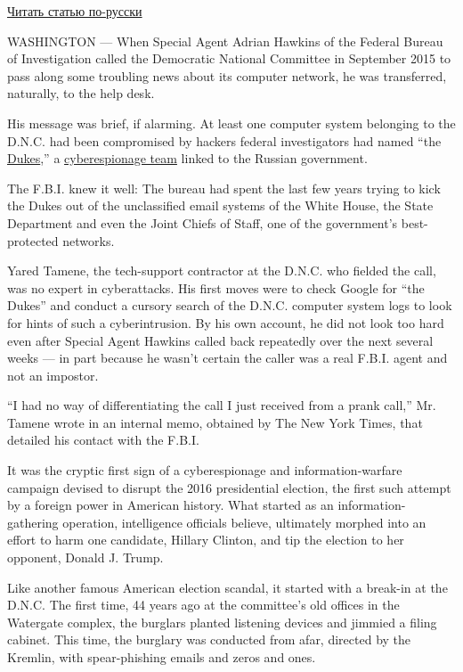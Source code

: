 \href{https://www.nytimes3xbfgragh.onion/2016/12/21/world/russia-hack-presidential-election.html}{Читать
статью по-русски}

WASHINGTON --- When Special Agent Adrian Hawkins of the Federal Bureau
of Investigation called the Democratic National Committee in September
2015 to pass along some troubling news about its computer network, he
was transferred, naturally, to the help desk.

His message was brief, if alarming. At least one computer system
belonging to the D.N.C. had been compromised by hackers federal
investigators had named ``the
\href{https://labsblog.f-secure.com/2015/09/17/the-dukes-7-years-of-russian-cyber-espionage/}{Dukes},''
a
\href{https://www.nytimes3xbfgragh.onion/2020/07/16/us/politics/vaccine-hacking-russia.html}{cyberespionage
team} linked to the Russian government.

The F.B.I. knew it well: The bureau had spent the last few years trying
to kick the Dukes out of the unclassified email systems of the White
House, the State Department and even the Joint Chiefs of Staff, one of
the government's best-protected networks.

Yared Tamene, the tech-support contractor at the D.N.C. who fielded the
call, was no expert in cyberattacks. His first moves were to check
Google for ``the Dukes'' and conduct a cursory search of the D.N.C.
computer system logs to look for hints of such a cyberintrusion. By his
own account, he did not look too hard even after Special Agent Hawkins
called back repeatedly over the next several weeks --- in part because
he wasn't certain the caller was a real F.B.I. agent and not an
impostor.

``I had no way of differentiating the call I just received from a prank
call,'' Mr. Tamene wrote in an internal memo, obtained by The New York
Times, that detailed his contact with the F.B.I.

It was the cryptic first sign of a cyberespionage and
information-warfare campaign devised to disrupt the 2016 presidential
election, the first such attempt by a foreign power in American history.
What started as an information-gathering operation, intelligence
officials believe, ultimately morphed into an effort to harm one
candidate, Hillary Clinton, and tip the election to her opponent, Donald
J. Trump.

Like another famous American election scandal, it started with a
break-in at the D.N.C. The first time, 44 years ago at the committee's
old offices in the Watergate complex, the burglars planted listening
devices and jimmied a filing cabinet. This time, the burglary was
conducted from afar, directed by the Kremlin, with spear-phishing emails
and zeros and ones.

